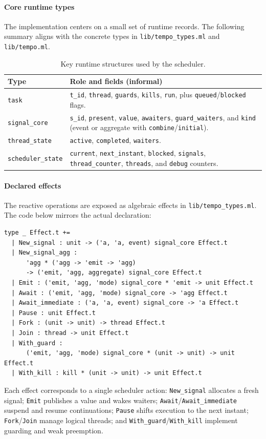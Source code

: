 \paragraph{Core runtime types}
The implementation centers on a small set of runtime records. The following
summary aligns with the concrete types in \texttt{lib/tempo\_types.ml} and
\texttt{lib/tempo.ml}.
\begin{table}[h]
\centering
\begin{tabularx}{\linewidth}{lY}
\hline
Type & Role and fields (informal) \\ \hline
\texttt{task} & \texttt{t\_id}, \texttt{thread}, \texttt{guards}, \texttt{kills},
\texttt{run}, plus \texttt{queued}/\texttt{blocked} flags. \\
\texttt{signal\_core} & \texttt{s\_id}, \texttt{present}, \texttt{value},
\texttt{awaiters}, \texttt{guard\_waiters}, and \texttt{kind} (event or
aggregate with \texttt{combine}/\texttt{initial}). \\
\texttt{thread\_state} & \texttt{active}, \texttt{completed}, \texttt{waiters}. \\
\texttt{scheduler\_state} & \texttt{current}, \texttt{next\_instant},
\texttt{blocked}, \texttt{signals}, \texttt{thread\_counter}, \texttt{threads},
and \texttt{debug} counters. \\ \hline
\end{tabularx}
\caption{Key runtime structures used by the scheduler.}
\end{table}

\paragraph{Declared effects}
The reactive operations are exposed as algebraic effects in
\texttt{lib/tempo\_types.ml}. The code below mirrors the actual declaration:
\begin{lstlisting}[style=tempo]
type _ Effect.t +=
  | New_signal : unit -> ('a, 'a, event) signal_core Effect.t
  | New_signal_agg :
      'agg * ('agg -> 'emit -> 'agg)
      -> ('emit, 'agg, aggregate) signal_core Effect.t
  | Emit : ('emit, 'agg, 'mode) signal_core * 'emit -> unit Effect.t
  | Await : ('emit, 'agg, 'mode) signal_core -> 'agg Effect.t
  | Await_immediate : ('a, 'a, event) signal_core -> 'a Effect.t
  | Pause : unit Effect.t
  | Fork : (unit -> unit) -> thread Effect.t
  | Join : thread -> unit Effect.t
  | With_guard :
      ('emit, 'agg, 'mode) signal_core * (unit -> unit) -> unit Effect.t
  | With_kill : kill * (unit -> unit) -> unit Effect.t
\end{lstlisting}
Each effect corresponds to a single scheduler action: \texttt{New\_signal}
allocates a fresh signal; \texttt{Emit} publishes a value and wakes waiters;
\texttt{Await}/\texttt{Await\_immediate} suspend and resume continuations;
\texttt{Pause} shifts execution to the next instant; \texttt{Fork}/\texttt{Join}
manage logical threads; and \texttt{With\_guard}/\texttt{With\_kill} implement
guarding and weak preemption.

